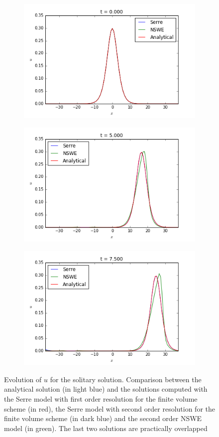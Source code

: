 \begin{figure}[h!]
	\begin{subfigure}{.3\linewidth}
		\includegraphics[scale=.3]{figures/Serre/4x4solitary1u.png}	
	\end{subfigure}
	\begin{subfigure}{.3\linewidth}
		\includegraphics[scale=.3]{figures/Serre/4x4solitary2u.png}	
	\end{subfigure}
	\begin{subfigure}{.3\linewidth}
		\includegraphics[scale=.3]{figures/Serre/4x4solitary3u.png}	
	\end{subfigure}
	\caption{Evolution of $u$ for the solitary solution. Comparison between the analytical solution (in light blue) and the solutions computed with the Serre model with first order resolution for the finite volume scheme (in red), the Serre model with second order resolution for the finite volume scheme (in dark blue)  and the second order NSWE model (in green). The last two solutions are practically overlapped \label{fig:solitaryu}}
\end{figure}

